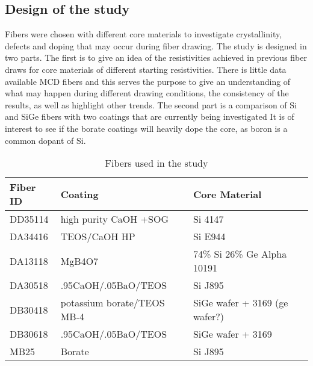 
\subsection{Design of the study}
Fibers were chosen with different core materials to investigate crystallinity, defects and doping that may occur during fiber drawing. The study is designed in two parts. The first is to give an idea of the resistivities achieved in previous fiber draws for core materials of different starting resistivities. There is little data available MCD fibers and this serves the purpose to give an understanding of what may happen during different drawing conditions, the consistency of the results, as well as highlight other trends. The second part is a comparison of Si and SiGe fibers with two coatings  that are currently being investigated %
It is of interest to see if the borate coatings will heavily dope the core, as boron is a common dopant of Si. 

 \begin{table}[h]
\begin{center}
    \begin{tabular}{|l|l|l|l|  }
    \hline
    \textbf{Fiber ID} & \textbf{Coating} & \textbf{Core Material}   \\ \hline
    
      DD35114 & high purity CaOH +SOG & Si 4147 \\
      DA34416 & TEOS/CaOH HP & Si E944 \\
      DA13118 & MgB4O7 & 74\% Si 26\% \newline Ge Alpha 10191 \\
      DA30518 & .95CaOH/.05BaO/TEOS & Si J895  \\ 
      DB30418 & potassium borate/TEOS MB-4 & SiGe wafer \newline+ 3169 (ge wafer?)    \\ 
      DB30618 & .95CaOH/.05BaO/TEOS & SiGe wafer \newline + 3169   \\ 
      MB25 & Borate & Si J895  \\
      
     \hline
    \end{tabular}
\end{center}
\caption{Fibers used in the study}
\label{Tab1}
\end{table}

